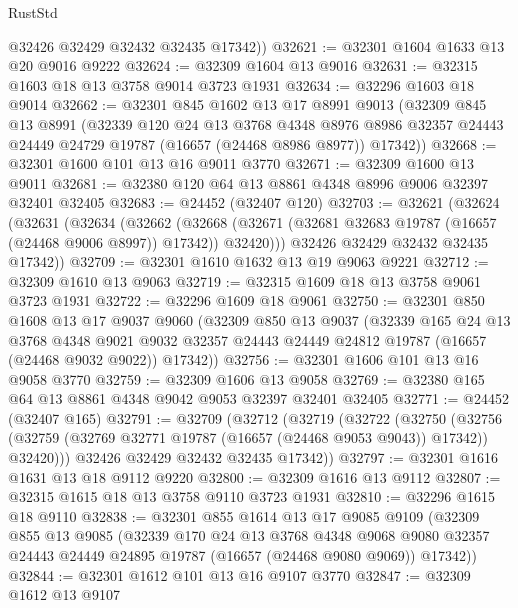 \begin{lexlean}{RustStd}
\begin{coremodule}
        @32426
        @32429
        @32432
        @32435
        @17342))
@32621 := @32301 @1604 @1633 @13 @20 @9016 @9222
@32624 := @32309 @1604 @13 @9016
@32631 := @32315 @1603 @18 @13 @3758 @9014 @3723 @1931
@32634 := @32296 @1603 @18 @9014
@32662 := @32301
    @845
    @1602
    @13
    @17
    @8991
    @9013
    (@32309
      @845
      @13
      @8991
      (@32339
        @120
        @24
        @13
        @3768
        @4348
        @8976
        @8986
        @32357
        @24443
        @24449
        @24729
        @19787
        (@16657 (@24468 @8986 @8977))
        @17342))
@32668 := @32301 @1600 @101 @13 @16 @9011 @3770
@32671 := @32309 @1600 @13 @9011
@32681 := @32380 @120 @64 @13 @8861 @4348 @8996 @9006 @32397 @32401 @32405
@32683 := @24452 (@32407 @120)
@32703 := @32621
    (@32624
      (@32631
        (@32634
          (@32662
            (@32668 (@32671 (@32681 @32683 @19787 (@16657 (@24468 @9006 @8997)) @17342)) @32420)))
        @32426
        @32429
        @32432
        @32435
        @17342))
@32709 := @32301 @1610 @1632 @13 @19 @9063 @9221
@32712 := @32309 @1610 @13 @9063
@32719 := @32315 @1609 @18 @13 @3758 @9061 @3723 @1931
@32722 := @32296 @1609 @18 @9061
@32750 := @32301
    @850
    @1608
    @13
    @17
    @9037
    @9060
    (@32309
      @850
      @13
      @9037
      (@32339
        @165
        @24
        @13
        @3768
        @4348
        @9021
        @9032
        @32357
        @24443
        @24449
        @24812
        @19787
        (@16657 (@24468 @9032 @9022))
        @17342))
@32756 := @32301 @1606 @101 @13 @16 @9058 @3770
@32759 := @32309 @1606 @13 @9058
@32769 := @32380 @165 @64 @13 @8861 @4348 @9042 @9053 @32397 @32401 @32405
@32771 := @24452 (@32407 @165)
@32791 := @32709
    (@32712
      (@32719
        (@32722
          (@32750
            (@32756 (@32759 (@32769 @32771 @19787 (@16657 (@24468 @9053 @9043)) @17342)) @32420)))
        @32426
        @32429
        @32432
        @32435
        @17342))
@32797 := @32301 @1616 @1631 @13 @18 @9112 @9220
@32800 := @32309 @1616 @13 @9112
@32807 := @32315 @1615 @18 @13 @3758 @9110 @3723 @1931
@32810 := @32296 @1615 @18 @9110
@32838 := @32301
    @855
    @1614
    @13
    @17
    @9085
    @9109
    (@32309
      @855
      @13
      @9085
      (@32339
        @170
        @24
        @13
        @3768
        @4348
        @9068
        @9080
        @32357
        @24443
        @24449
        @24895
        @19787
        (@16657 (@24468 @9080 @9069))
        @17342))
@32844 := @32301 @1612 @101 @13 @16 @9107 @3770
@32847 := @32309 @1612 @13 @9107

\end{coremodule}
\end{lexlean}
